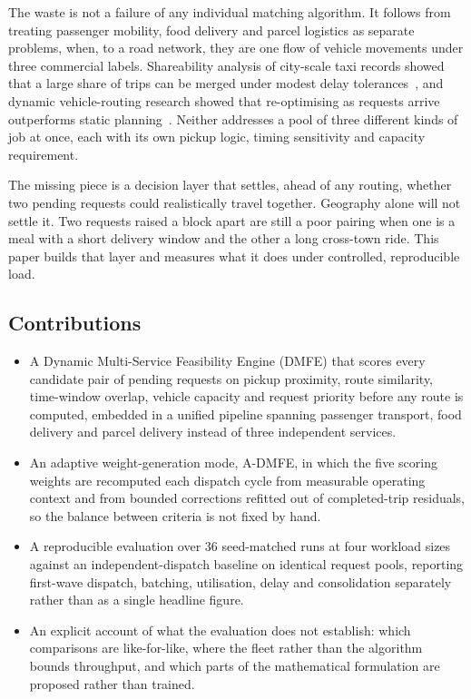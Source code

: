 \documentclass[conference]{IEEEtran}
\begin{document}
The waste is not a failure of any individual matching algorithm. It follows from treating passenger mobility, food delivery and parcel logistics as separate problems, when, to a road network, they are one flow of vehicle movements under three commercial labels. Shareability analysis of city-scale taxi records showed that a large share of trips can be merged under modest delay tolerances~\cite{ref1}, and dynamic vehicle-routing research showed that re-optimising as requests arrive outperforms static planning~\cite{ref7}. Neither addresses a pool of three different kinds of job at once, each with its own pickup logic, timing sensitivity and capacity requirement.

The missing piece is a decision layer that settles, ahead of any routing, whether two pending requests could realistically travel together. Geography alone will not settle it. Two requests raised a block apart are still a poor pairing when one is a meal with a short delivery window and the other a long cross-town ride. This paper builds that layer and measures what it does under controlled, reproducible load.

\subsection{Contributions}
\begin{itemize}
    \item A Dynamic Multi-Service Feasibility Engine (DMFE) that scores every candidate pair of pending requests on pickup proximity, route similarity, time-window overlap, vehicle capacity and request priority before any route is computed, embedded in a unified pipeline spanning passenger transport, food delivery and parcel delivery instead of three independent services.
    \item An adaptive weight-generation mode, A-DMFE, in which the five scoring weights are recomputed each dispatch cycle from measurable operating context and from bounded corrections refitted out of completed-trip residuals, so the balance between criteria is not fixed by hand.
    \item A reproducible evaluation over 36 seed-matched runs at four workload sizes against an independent-dispatch baseline on identical request pools, reporting first-wave dispatch, batching, utilisation, delay and consolidation separately rather than as a single headline figure.
    \item An explicit account of what the evaluation does not establish: which comparisons are like-for-like, where the fleet rather than the algorithm bounds throughput, and which parts of the mathematical formulation are proposed rather than trained.
\end{itemize}
\end{document}

